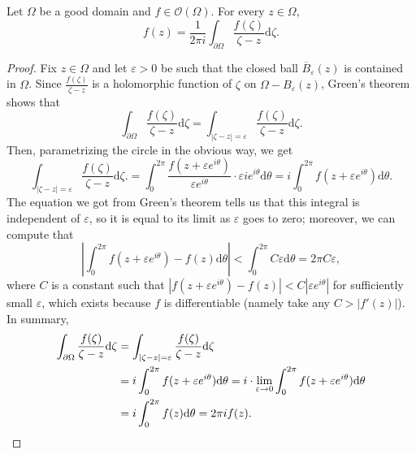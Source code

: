 \documentclass[10pt]{article}
\providecommand{\ol}{\overline}
\providecommand{\eps}{\varepsilon}
\providecommand{\dd}{\mathrm d}
\providecommand{\abs}[1]{\left\lvert{#1}\right\rvert}
\begin{document}
\begin{theorem}
    \label{thm:cauchy-integral-formula}
    Let $\Omega$ be a good domain and $f\in\mathcal O(\Omega)$.
    For every $z\in\Omega$,
    \begin{equation*}
	f(z) =
	\frac 1{2\pi i}\int_{\partial\Omega}\frac{f(\zeta)}{\zeta-z}\dd\zeta.
    \end{equation*}
\end{theorem}

\begin{proof}
    Fix $z\in\Omega$ and let $\eps>0$ be such that
    the closed ball $\ol B_\eps(z)$ is contained in $\Omega$.
    Since $\frac{f(\zeta)}{\zeta - z}$ is a holomorphic function of $\zeta$
    on $\Omega - B_\eps(z)$, Green's theorem shows that
    \begin{equation*}
	\int_{\partial\Omega}\frac{f(\zeta)}{\zeta-z}\dd\zeta
	= \int_{\abs{\zeta-z} = \eps} \frac{f(\zeta)}{\zeta-z}\dd\zeta.
    \end{equation*}
    Then, parametrizing the circle in the obvious way, we get
    \begin{equation*}
	\int_{\abs{\zeta-z} = \eps} \frac{f(\zeta)}{\zeta-z}\dd\zeta.
	= \int_0^{2\pi}\frac{f(z+\eps e^{i\theta})}{\eps e^{i\theta}}
	\cdot \eps ie^{i\theta}\dd\theta
	= i\int_0^{2\pi}f(z+\eps e^{i\theta})\dd\theta.
    \end{equation*}
    The equation we got from Green's theorem tells us that
    this integral is independent of $\eps$,
    so it is equal to its limit as $\eps$ goes to zero;
    moreover, we can compute that
    \begin{equation*}
	\abs{\int_0^{2\pi}f(z+\eps e^{i\theta}) - f(z)\dd\theta}
	< \int_0^{2\pi} C\eps\dd\theta = 2\pi C\eps,
    \end{equation*}
    where $C$ is a constant such that
    $\abs{f(z + \eps e^{i\theta}) - f(z)} < C\abs{\eps e^{i\theta}}$
    for sufficiently small $\eps$, which exists because $f$ is differentiable
    (namely take any $C > \abs{f'(z)}$). In summary,
    \begin{align*}
	\int_{\partial\Omega}\frac{f(\zeta)}{\zeta - z}\dd\zeta
	&= \int_{\abs{\zeta - z} = \eps}\frac{f(\zeta)}{\zeta - z}\dd\zeta\\
	&= i\int_0^{2\pi}f(z + \eps e^{i\theta})\dd\theta
	= i\cdot \lim_{\eps\to 0}
	\int_0^{2\pi}f(z + \eps e^{i\theta})\dd\theta\\
	&= i\int_0^{2\pi} f(z)\dd\theta = 2\pi if(z).\qedhere
    \end{align*}
\end{proof}
\end{document}
